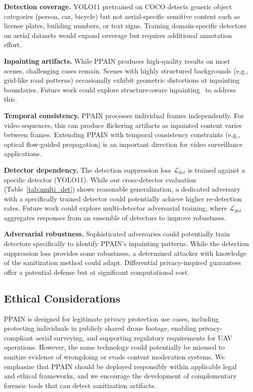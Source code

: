 \documentclass[preprint,12pt]{elsarticle}
\begin{document}
\textbf{Detection coverage.} YOLO11 pretrained on COCO detects generic object categories (person, car, bicycle) but not aerial-specific sensitive content such as license plates, building numbers, or text signs. Training domain-specific detectors on aerial datasets would expand coverage but requires additional annotation effort.

\textbf{Inpainting artifacts.} While PPAIN produces high-quality results on most scenes, challenging cases remain. Scenes with highly structured backgrounds (e.g., grid-like road patterns) occasionally exhibit geometric distortions at inpainting boundaries. Future work could explore structure-aware inpainting~\cite{wan2021high} to address this.

\textbf{Temporal consistency.} PPAIN processes individual frames independently. For video sequences, this can produce flickering artifacts as inpainted content varies between frames. Extending PPAIN with temporal consistency constraints (e.g., optical flow-guided propagation) is an important direction for video surveillance applications.

\textbf{Detector dependency.} The detection suppression loss $\mathcal{L}_{det}$ is trained against a specific detector (YOLO11). While our cross-detector evaluation (Table~\ref{tab:multi_det}) shows reasonable generalization, a dedicated adversary with a specifically trained detector could potentially achieve higher re-detection rates. Future work could explore multi-detector adversarial training, where $\mathcal{L}_{det}$ aggregates responses from an ensemble of detectors to improve robustness.

\textbf{Adversarial robustness.} Sophisticated adversaries could potentially train detectors specifically to identify PPAIN's inpainting patterns. While the detection suppression loss provides some robustness, a determined attacker with knowledge of the sanitization method could adapt. Differential privacy-inspired guarantees~\cite{ryoo2017privacy} offer a potential defense but at significant computational cost.

\subsection{Ethical Considerations}

PPAIN is designed for legitimate privacy protection use cases, including protecting individuals in publicly shared drone footage, enabling privacy-compliant aerial surveying, and supporting regulatory requirements for UAV operations. However, the same technology could potentially be misused to sanitize evidence of wrongdoing or evade content moderation systems. We emphasize that PPAIN should be deployed responsibly within applicable legal and ethical frameworks, and we encourage the development of complementary forensic tools that can detect sanitization artifacts.
\end{document}
